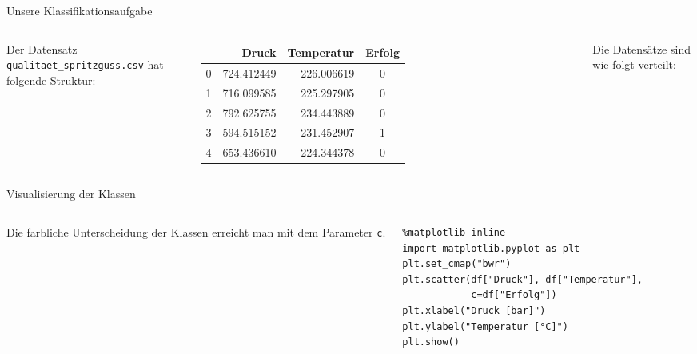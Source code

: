 \begin{frame}{Unsere Klassifikationsaufgabe}
\begin{columns}
Der Datensatz \texttt{qualitaet\_spritzguss.csv} hat folgende Struktur:

\vspace{0.6em}
\centering
{\footnotesize
\renewcommand{\arraystretch}{1.3}
\setlength{\tabcolsep}{6pt}
\begin{tabular}{r r r c}
& \textbf{Druck} & \textbf{Temperatur} & \textbf{Erfolg}\\
\hline
0 & 724.412449 & 226.006619 & 0\\
1 & 716.099585 & 225.297905 & 0\\
2 & 792.625755 & 234.443889 & 0\\
3 & 594.515152 & 231.452907 & 1\\
4 & 653.436610 & 224.344378 & 0\\
\end{tabular}}

Die  Datensätze sind wie folgt verteilt:
\vspace{0.4em}
\centering

\end{columns}
\end{frame}

\begin{frame}[fragile]{Visualisierung der Klassen}
\begin{columns}

Die farbliche Unterscheidung der Klassen erreicht man mit dem Parameter
\texttt{c}.


\begin{verbatim}
%matplotlib inline
import matplotlib.pyplot as plt
plt.set_cmap("bwr")
plt.scatter(df["Druck"], df["Temperatur"],
            c=df["Erfolg"])
plt.xlabel("Druck [bar]")
plt.ylabel("Temperatur [°C]")
plt.show()
\end{verbatim}

\centering

\end{columns}
\end{frame}


